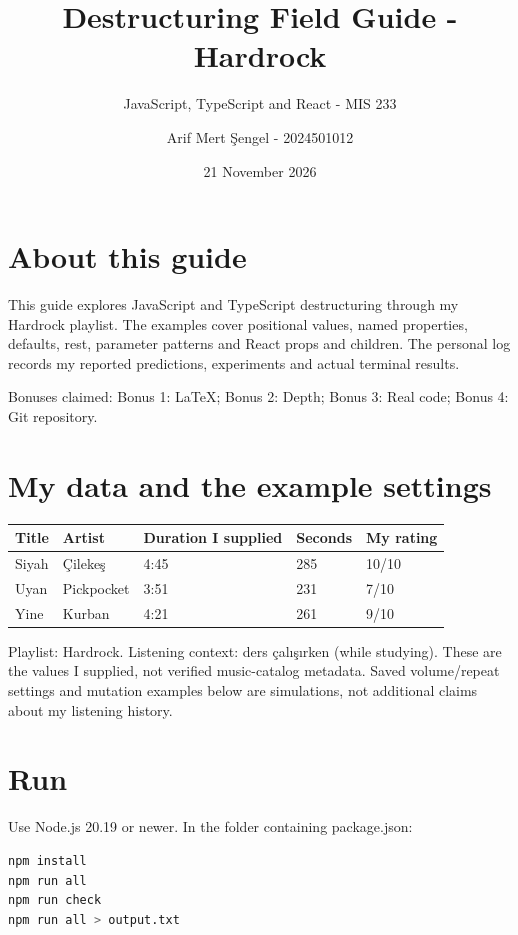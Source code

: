 \documentclass[
  10pt,
  a4paper,
  titlepage]{article}
\title{Destructuring Field Guide - Hardrock}
\subtitle{JavaScript, TypeScript and React - MIS 233}
\author{Arif Mert Şengel - 2024501012}
\date{21 November 2026}
\newcounter{none} %
\let\guidetoc\tableofcontents
\renewcommand{\tableofcontents}{\guidetoc\clearpage}
\let\guidemaketitle\maketitle
\renewcommand{\maketitle}{\hypersetup{pageanchor=false}\guidemaketitle\hypersetup{pageanchor=true}}
\begin{document}
\maketitle

{
\setcounter{tocdepth}{1}
\tableofcontents
}
\section{About this guide}\label{about-this-guide}

This guide explores JavaScript and TypeScript destructuring through my
Hardrock playlist. The examples cover positional values, named
properties, defaults, rest, parameter patterns and React props and
children. The personal log records my reported predictions, experiments
and actual terminal results.

Bonuses claimed: Bonus 1: LaTeX; Bonus 2: Depth; Bonus 3: Real code;
Bonus 4: Git repository.

\section{My data and the example
settings}\label{my-data-and-the-example-settings}

{\def\LTcaptype{none} %
\begin{longtable}[]{@{}lllll@{}}
\toprule\noalign{}
Title & Artist & Duration I supplied & Seconds & My rating \\
\midrule\noalign{}
\endhead
\bottomrule\noalign{}
\endlastfoot
Siyah & Çilekeş & 4:45 & 285 & 10/10 \\
Uyan & Pickpocket & 3:51 & 231 & 7/10 \\
Yine & Kurban & 4:21 & 261 & 9/10 \\
\end{longtable}
}

Playlist: Hardrock. Listening context: ders çalışırken (while studying).
These are the values I supplied, not verified music-catalog metadata.
Saved volume/repeat settings and mutation examples below are
simulations, not additional claims about my listening history.

\section{Run}\label{run}

Use Node.js 20.19 or newer. In the folder containing package.json:

\Needspace{61.8pt}
\begin{lstlisting}[language=sh]
npm install
npm run all
npm run check
npm run all > output.txt
\end{lstlisting}
\end{document}
